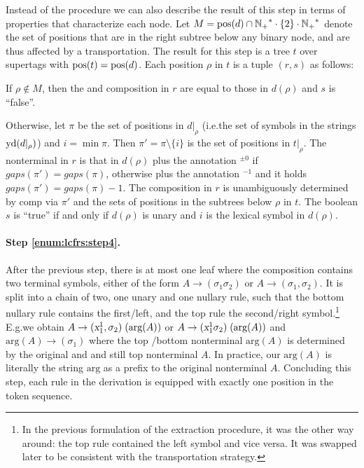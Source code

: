 \documentclass[../../document.tex]{subfiles}
\begin{document}
    Instead of the procedure we can also describe the result of this step in terms of properties that characterize each node.
    Let \(M = \operatorname{pos}(d) \cap {\ensuremath{\mathbb{N}}_+}^* \cdot \{2\} \cdot {\ensuremath{\mathbb{N}}_+}^*\) denote the set of positions that are in the right subtree below any binary node, and are thus affected by a transportation.
    The result for this step is a tree \(t\) over  supertags with \(\operatorname{pos}(t) = \operatorname{pos}(d)\).
    Each position \(\rho\) in \(t\) is a tuple \((r, s)\) as follows:
    \begin{compactitem}
        \item If \(\rho \notin M\), then the  and composition in \(r\) are equal to those in \(d(\rho)\) and \(s\) is ``false''.
        \item
            Otherwise, let \(\pi\) be the set of positions in \(d|_\rho\) (i.e.\@ the set of symbols in the strings \(\operatorname{yd}(d|_\rho)\)) and \(i = \min \pi\).
            Then \(\pi' = \pi \setminus \{i\}\) is the set of positions in \(t|_\rho\).
            The  nonterminal in \(r\) is that in \(d(\rho)\) plus the annotation \(^{\pm 0}\) if \(gaps(\pi') = gaps(\pi)\), otherwise plus the annotation \(^{-1}\) and it holds \(gaps(\pi') = gaps(\pi)-1\).
            The composition in \(r\) is unambiguously determined by \(\mathrm{comp}\) via \(\pi'\) and the sets of positions in the subtrees below \(\rho\) in \(t\).
            The boolean \(s\) is ``true'' if and only if \(d(\rho)\) is unary and \(i\) is the lexical symbol in \(d(\rho)\).
    \end{compactitem}


    \paragraph{Step \ref{enum:lcfrs:step4}.}
    After the previous step, there is at most one leaf where the  composition contains two terminal symbols, either of the form \(A \to (\sigma_1 \sigma_2)\) or \(A \to (\sigma_1, \sigma_2)\).
    It is split into a chain of two, one unary and one nullary rule, such that the bottom nullary rule contains the first/left, and the top rule the second/right symbol.\footnote{
        In the previous formulation of the extraction procedure, it was the other way around: the top rule contained the left symbol and vice versa.
        It was swapped later to be consistent with the transportation strategy.
    }
    E.g.\@ we obtain \(A \to (\textsl{x}_1^1, \sigma_2)\;(\text{arg}(A))\) or \(A \to (\textsl{x}_1^1 \sigma_2)\;(\text{arg}(A))\) and \(\text{arg}(A) \to (\sigma_1)\) where the top /bottom  nonterminal \(\text{arg}(A)\) is determined by the original and and still top  nonterminal \(A\).
    In practice, our \(\text{arg}(A)\) is literally the string \(\text{arg}\) as a prefix to the original nonterminal \(A\).
    Concluding this step, each rule in the derivation is equipped with exactly one position in the token sequence.
\end{document}
